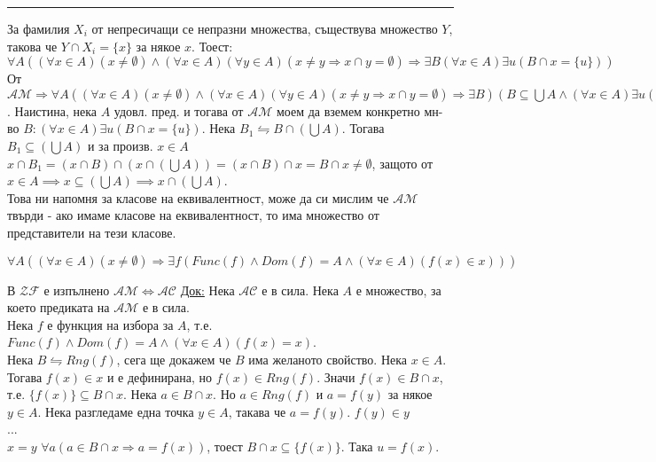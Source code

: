 \documentclass[fleqn, titlepage, 12pt]{report}
\begin{document}
\bigbreak
\hrule
\bigbreak

 За фамилия $ X_i $ от непресичащи се непразни множества, съществува множество $ Y $,
такова че $ Y \cap X_i = \{ x \}$ за някое $ x $. Тоест:\\
$ \forall{A}((\forall{x \in A})(x \neq \emptyset) \land (\forall{x \in A})(\forall{y \in A})(x \neq y \Rightarrow 
x \cap y = \emptyset) \Rightarrow \exists{B}(\forall{x \in A})\exists{u} (B \cap x = \{ u \})) $
\bigbreak
От $ \mathcal{AM} \Rightarrow \forall{A}((\forall{x \in A})(x \neq \emptyset) \land 
(\forall{x \in A})(\forall{y \in A})(x \neq y \Rightarrow x \cap y = \emptyset) \Rightarrow \exists{B})(B \subseteq \bigcup A \land (\forall{x \in A})\exists{u}(B \cap x = \{ u \})) $. Наистина, нека $ A $ удовл. пред. и тогава от
$ \mathcal{AM} $ моем да вземем конкретно мн-во $ B : (\forall{x \in A})\exists{u}(B \cap x = \{ u \}) $.
Нека $ B_1 \leftrightharpoons B \cap (\bigcup A) $. Тогава $ B_1 \subseteq (\bigcup A) $ и за произв. $ x \in A $
$ x \cap B_1 = (x \cap B) \cap (x \cap (\bigcup A)) = (x \cap B) \cap x = B \cap x \neq \emptyset$,
защото от $ x \in A \implies x \subseteq (\bigcup A) \implies x \cap (\bigcup A) $. \\
Това ни напомня за класове на еквивалентност, може да си мислим че $ \mathcal{AM} $ твърди - ако имаме класове на
еквивалентност, то има множество от представители на тези класове.
\bigbreak

 $ \forall{A}((\forall{x \in A})(x \neq \emptyset) \Rightarrow \exists{f}(Func(f) \land Dom(f) = A \land (\forall{x \in A})(f(x) \in x))) $
\bigbreak

 В $\mathcal{ZF}$ е изпълнено $ \mathcal{AM} \Longleftrightarrow \mathcal{AC}$
\bigbreak
\underline{Док:} Нека $ \mathcal{AC} $ е в сила. Нека $ A $ е множество, за което предиката на $ \mathcal{AM} $
е в сила.\\
Нека $ f $ е функция на избора за $ A $, т.е. $ Func(f) \land Dom(f) = A \land (\forall{x \in A})(f(x) = x) $.\\
Нека $ B \leftrightharpoons Rng(f) $, сега ще докажем че $ B $ има желаното свойство. Нека $ x \in A $. Тогава
$ f(x) \in x $ и е дефинирана, но $ f(x) \in Rng(f) $.
Значи $ f(x) \in B \cap x $, т.е. $ \{ f(x) \} \subseteq B \cap x $.
Нека $ a \in B \cap x $. Но $ a \in Rng(f) $ и $ a = f(y) $ за някое $ y \in A $.
Нека разгледаме една точка $ y \in A $, такава че $ a = f(y) $. $ f(y) \in y $\\
...\\
$ x = y $
$ \forall{a}(a \in B \cap x \Rightarrow a = f(x)) $, тоест $ B \cap x \subseteq \{ f(x) \} $. Така $ u = f(x) $.
\bigbreak
\end{document}
